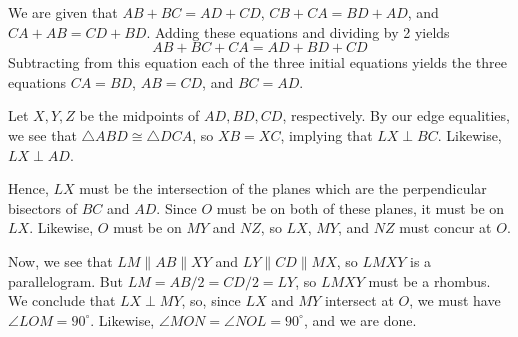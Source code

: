 \begin{mdsoln}
We are given that $AB+BC=AD+CD$, $CB+CA=BD+AD$, and $CA+AB=CD+BD$. Adding these equations and dividing by 2 yields$$AB+BC+CA=AD+BD+CD$$Subtracting from this equation each of the three initial equations yields the three equations $CA=BD$, $AB=CD$, and $BC=AD$.

Let $X,Y,Z$ be the midpoints of $AD,BD,CD$, respectively. By our edge equalities, we see that $\triangle ABD\cong \triangle DCA$, so $XB=XC$, implying that $LX\perp BC$. Likewise, $LX\perp AD$.

Hence, $LX$ must be the intersection of the planes which are the perpendicular bisectors of $BC$ and $AD$. Since $O$ must be on both of these planes, it must be on $LX$. Likewise, $O$ must be on $MY$ and $NZ$, so $LX$, $MY$, and $NZ$ must concur at $O$.

Now, we see that $LM\parallel AB\parallel XY$ and $LY\parallel CD\parallel MX$, so $LMXY$ is a parallelogram. But $LM=AB/2=CD/2=LY$, so $LMXY$ must be a rhombus. We conclude that $LX\perp MY$, so, since $LX$ and $MY$ intersect at $O$, we must have $\angle LOM=90^\circ$. Likewise, $\angle MON=\angle NOL=90^\circ$, and we are done.    
\end{mdsoln}
